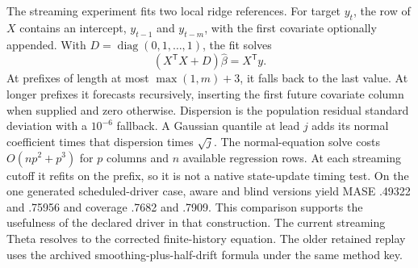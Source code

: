 The streaming experiment fits two local ridge references. For target $y_t$, the row of $X$ contains an intercept, $y_{t-1}$ and $y_{t-m}$, with the first covariate optionally appended. With $D=\operatorname{diag}(0,1,\ldots,1)$, the fit solves
\begin{equation}
 (X^\mathsf{T}X+D)\widehat\beta=X^\mathsf{T}y .
\end{equation}
At prefixes of length at most $\max(1,m)+3$, it falls back to the last value. At longer prefixes it forecasts recursively, inserting the first future covariate column when supplied and zero otherwise. Dispersion is the population residual standard deviation with a $10^{-6}$ fallback. A Gaussian quantile at lead $j$ adds its normal coefficient times that dispersion times $\sqrt{j}$. The normal-equation solve costs $O(np^2+p^3)$ for $p$ columns and $n$ available regression rows. At each streaming cutoff it refits on the prefix, so it is not a native state-update timing test. On the one generated scheduled-driver case, aware and blind versions yield MASE .49322 and .75956 and coverage .7682 and .7909. This comparison supports the usefulness of the declared driver in that construction. The current streaming Theta resolves to the corrected finite-history equation. The older retained replay uses the archived smoothing-plus-half-drift formula under the same method key.
